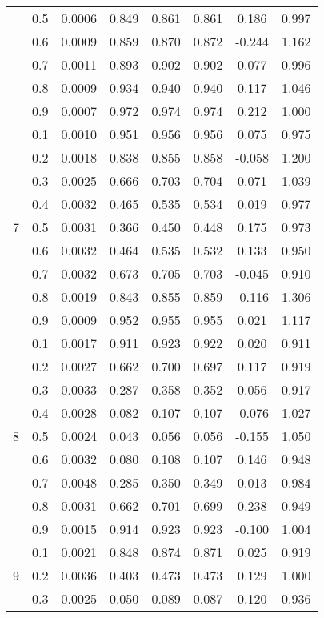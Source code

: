 \documentclass[11pt,a4paper]{report}
\begin{document}
\begin{longtable}{ | c | c || c | c | c | c | c | c | }
 & 0.5 & 0.0006 & 0.849 & 0.861 & 0.861 & 0.186 & 0.997 \\
 & 0.6 & 0.0009 & 0.859 & 0.870 & 0.872 & -0.244 & 1.162 \\
 & 0.7 & 0.0011 & 0.893 & 0.902 & 0.902 & 0.077 & 0.996 \\
 & 0.8 & 0.0009 & 0.934 & 0.940 & 0.940 & 0.117 & 1.046 \\
 & 0.9 & 0.0007 & 0.972 & 0.974 & 0.974 & 0.212 & 1.000 \\
 \hline
\multirow{9}{*}{7} & 0.1 & 0.0010 & 0.951 & 0.956 & 0.956 & 0.075 & 0.975 \\
 & 0.2 & 0.0018 & 0.838 & 0.855 & 0.858 & -0.058 & 1.200 \\
 & 0.3 & 0.0025 & 0.666 & 0.703 & 0.704 & 0.071 & 1.039 \\
 & 0.4 & 0.0032 & 0.465 & 0.535 & 0.534 & 0.019 & 0.977 \\
 & 0.5 & 0.0031 & 0.366 & 0.450 & 0.448 & 0.175 & 0.973 \\
 & 0.6 & 0.0032 & 0.464 & 0.535 & 0.532 & 0.133 & 0.950 \\
 & 0.7 & 0.0032 & 0.673 & 0.705 & 0.703 & -0.045 & 0.910 \\
 & 0.8 & 0.0019 & 0.843 & 0.855 & 0.859 & -0.116 & 1.306 \\
 & 0.9 & 0.0009 & 0.952 & 0.955 & 0.955 & 0.021 & 1.117 \\
 \hline
\multirow{9}{*}{8} & 0.1 & 0.0017 & 0.911 & 0.923 & 0.922 & 0.020 & 0.911 \\
 & 0.2 & 0.0027 & 0.662 & 0.700 & 0.697 & 0.117 & 0.919 \\
 & 0.3 & 0.0033 & 0.287 & 0.358 & 0.352 & 0.056 & 0.917 \\
 & 0.4 & 0.0028 & 0.082 & 0.107 & 0.107 & -0.076 & 1.027 \\
 & 0.5 & 0.0024 & 0.043 & 0.056 & 0.056 & -0.155 & 1.050 \\
 & 0.6 & 0.0032 & 0.080 & 0.108 & 0.107 & 0.146 & 0.948 \\
 & 0.7 & 0.0048 & 0.285 & 0.350 & 0.349 & 0.013 & 0.984 \\
 & 0.8 & 0.0031 & 0.662 & 0.701 & 0.699 & 0.238 & 0.949 \\
 & 0.9 & 0.0015 & 0.914 & 0.923 & 0.923 & -0.100 & 1.004 \\
 \hline
\multirow{9}{*}{9} & 0.1 & 0.0021 & 0.848 & 0.874 & 0.871 & 0.025 & 0.919 \\
 & 0.2 & 0.0036 & 0.403 & 0.473 & 0.473 & 0.129 & 1.000 \\
 & 0.3 & 0.0025 & 0.050 & 0.089 & 0.087 & 0.120 & 0.936 \\

\end{longtable}
\end{document}
